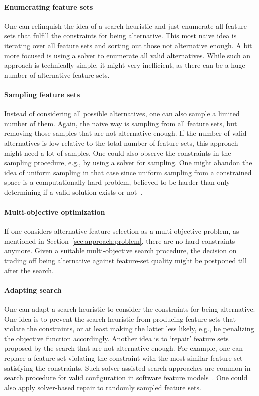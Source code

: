 \documentclass{article}
\theoremstyle{definition}
\begin{document}
\paragraph{Enumerating feature sets}

One can relinquish the idea of a search heuristic and just enumerate all feature sets that fulfill the constraints for being alternative.
This most naive idea is iterating over all feature sets and sorting out those not alternative enough.
A bit more focused is using a solver to enumerate all valid alternatives.
While such an approach is technically simple, it might very inefficient, as there can be a huge number of alternative feature sets.

\paragraph{Sampling feature sets}

Instead of considering all possible alternatives, one can also sample a limited number of them.
Again, the naive way is sampling from all feature sets, but removing those samples that are not alternative enough.
If the number of valid alternatives is low relative to the total number of feature sets, this approach might need a lot of samples.
One could also observe the constraints in the sampling procedure, e.g., by using a solver for sampling.
One might abandon the idea of uniform sampling in that case since uniform sampling from a constrained space is a computationally hard problem, believed to be harder than only determining if a valid solution exists or not~\cite{ermon2012uniform}.

\paragraph{Multi-objective optimization}

If one considers alternative feature selection as a multi-objective problem, as mentioned in Section~\ref{sec:approach:problem}, there are no hard constraints anymore.
Given a suitable multi-objective search procedure, the decision on trading off being alternative against feature-set quality might be postponed till after the search.

\paragraph{Adapting search}

One can adapt a search heuristic to consider the constraints for being alternative.
One idea is to prevent the search heuristic from producing feature sets that violate the constraints, or at least making the latter less likely, e.g., be penalizing the objective function accordingly.
Another idea is to `repair' feature sets proposed by the search that are not alternative enough.
For example, one can replace a feature set violating the constraint with the most similar feature set satisfying the constraints.
Such solver-assisted search approaches are common in search procedure for valid configuration in software feature models~\cite{guo2018preserve, henard2015combining, white2010automated}.
One could also apply solver-based repair to randomly sampled feature sets.
\end{document}
